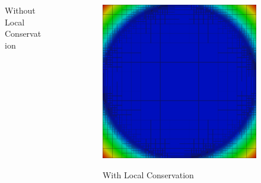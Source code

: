\documentclass[mathserif]{beamer}
\begin{document}
\begin{frame}
{\begin{columns}[b]
\begin{column}{0.5\textwidth}
\begin{figure}[t]
Without Local Conservation
\end{figure}
\end{column}
\begin{column}{0.5\textwidth}
\begin{figure}[t]
\centering
\includegraphics[width=1.0\textwidth]{../figs/Vortex/robust6c.png}

With Local Conservation
\end{figure}
\end{column}
\end{columns}
}
\end{frame}
\end{document}
